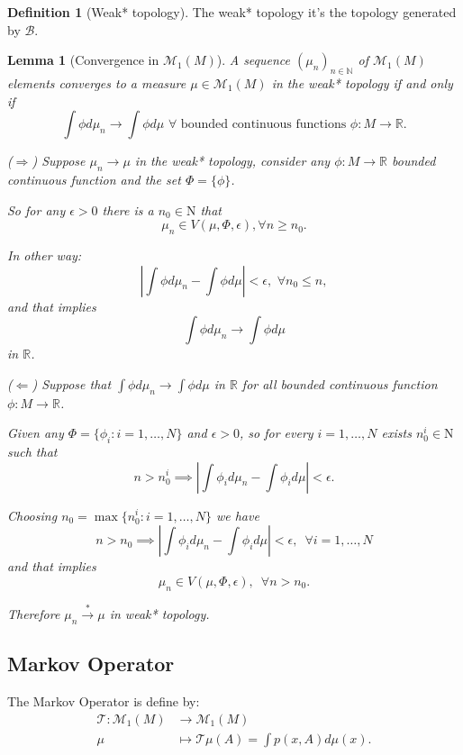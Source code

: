 \documentclass[a4paper]{article}
\theoremstyle{plain}
\newtheorem{lemma}[theorem]{Lemma}
\theoremstyle{definition}
\newtheorem{defn}[theorem]{Definition}%
\begin{document}
\begin{defn}[Weak* topology] The weak* topology it's the topology generated by $\mathcal{B}$.
\end{defn}

\begin{lemma}[Convergence in $\mathcal{M}_1(M)$]
    A sequence $(\mu_n)_{n \in \mathbb{N}}$ of $\mathcal{M}_1(M)$ elements converges to a measure $\mu \in \mathcal{M}_1(M)$ in the weak* topology if and only if 
    $$ \int \phi d\mu_n \to \int \phi d\mu \,\,\forall \text{ bounded continuous functions } \phi:M \to \mathbb{R}.$$

    \proof ($\Longrightarrow$) Suppose $\mu_n \to \mu$ in the weak* topology, consider any $\phi:M \to \mathbb{R}$ bounded continuous function and the set $\Phi = \{\phi\}$.

    So for any $\epsilon>0$ there is a $n_0 \in \mathrm{N}$ that 
    $$\mu_n \in V(\mu, \Phi, \epsilon), \forall n \geq n_0.$$

    In other way: 
    $$ \left| \int \phi d \mu_n - \int \phi d \mu \right| < \epsilon, \,\, \forall n_0 \leq n,$$
and that implies 
    $$\int \phi d \mu_n \to \int \phi d \mu$$
in $\mathbb{R}$.

($\Longleftarrow$) Suppose that  $\int \phi d \mu_n \to \int \phi d \mu$ in $\mathbb{R}$ for all bounded continuous function $\phi:M \to \mathbb{R}$. 

    Given any $\Phi = \{\phi_i: i=1,\dots,N\}$ and $\epsilon>0$, so for every $i=1,\dots,N$ exists $n_0^i \in \mathrm{N}$ such that 
    $$ n > n_0^i \implies \left|  \int \phi_i d \mu_n - \int \phi_i d \mu \right| < \epsilon.$$

    Choosing $n_0 = \max\{n_0^i: i=1,\dots,N\}$ we have 
    $$ n > n_0 \implies \left|  \int \phi_i d \mu_n - \int \phi_i d \mu \right| < \epsilon, \,\,\, \forall i=1,\dots,N$$
and that implies 
    $$\mu_n \in V(\mu,\Phi, \epsilon),\,\,\, \forall n>n_0.$$

    Therefore $\mu_n \overset{*}{\to} \mu$ in weak* topology.
\end{lemma}

\subsection{Markov Operator}

The Markov Operator is define by:
\begin{align*}
    \mathcal{T}:\mathcal{M}_1(M) &\to \mathcal{M}_1(M)\\
    \mu &\mapsto \mathcal{T}\mu (A) = \int p(x,A) d\mu(x). 
\end{align*}
\end{document}
